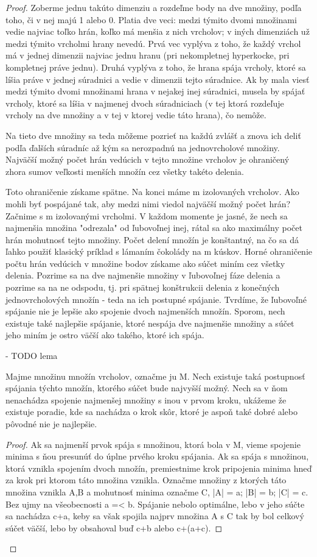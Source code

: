\begin{proof}
Zoberme jednu takúto dimenziu a rozdeľme body na dve množiny, podľa toho,
či v nej majú 1 alebo 0. Platia dve veci: medzi týmito dvomi množinami vedie
najviac toľko hrán, koľko má menšia z nich vrcholov; v iných dimenziách už
medzi týmito vrcholmi hrany nevedú.
Prvá vec vyplýva z toho, že každý vrchol má v jednej dimenzii najviac jednu
hranu (pri nekompletnej hyperkocke, pri kompletnej práve jednu).
Druhá vyplýva z toho, že hrana spája vrcholy, ktoré sa líšia práve v jednej
súradnici a vedie v dimenzii tejto súradnice. Ak by mala viesť medzi týmito
dvomi množinami hrana v nejakej inej súradnici, musela by spájať vrcholy,
ktoré sa líšia v najmenej dvoch súradniciach (v tej ktorá rozdeľuje vrcholy
na dve množiny a v tej v ktorej vedie táto hrana), čo nemôže.

Na tieto dve množiny sa teda môžeme pozrieť na každú zvlášť a znova ich
deliť podľa ďalších súradníc až kým sa nerozpadnú na jednovrcholové množiny.
Najväčší možný počet hrán vedúcich v tejto množine vrcholov je ohraničený
zhora sumov veľkosti menších množín cez všetky takéto delenia.

Toto ohraničenie získame spätne. Na konci máme m izolovaných vrcholov. Ako
mohli byť pospájané tak, aby medzi nimi viedol najväčší možný počet hrán?
Začnime s m izolovanými vrcholmi. V každom momente je jasné, že nech sa
najmenšia množina "odrezala" od ľubovoľnej inej, rátal sa ako maximálny
počet hrán mohutnosť tejto množiny.
Počet delení množín je konštantný, na čo sa dá ľahko použiť klasický príklad
s lámaním čokolády na m kúskov. Horné ohraničenie počtu hrán vedúcich v
množine bodov získame ako súčet miním cez všetky delenia. Pozrime sa na dve
najmenšie množiny v ľubovoľnej fáze delenia a pozrime sa na ne odspodu, tj.
pri spätnej konštrukcii delenia z konečných jednovrcholových množín - teda
na ich postupné spájanie.
Tvrdíme, že ľubovoľné spájanie nie je lepšie ako spojenie dvoch najmenších
množín. Sporom, nech existuje také najlepšie spájanie, ktoré nespája dve najmenšie
množiny a súčet jeho miním je ostro väčší ako takého, ktoré ich spája.

- TODO lema
\begin{lem}
Majme množinu množín vrcholov, označme
ju M. Nech existuje taká postupnosť spájania týchto množín,
ktorého súčet bude najvyšší možný. Nech sa v ňom nenachádza spojenie
najmenšej množiny s inou v prvom kroku, ukážeme že existuje poradie, kde sa
nachádza o krok skôr, ktoré je aspoň také dobré alebo pôvodné nie je
najlepšie.
\end{lem}
\begin{proof}
Ak sa najmenší prvok spája s množinou, ktorá bola v M, vieme spojenie minima
s ňou presunúť do úplne prvého kroku spájania.
Ak sa spája s množinou, ktorá vznikla spojením dvoch množín, premiestnime
krok pripojenia minima hneď za krok pri ktorom táto množina vznikla. Označme
  množiny z ktorých táto množina vznikla A,B a mohutnosť minima 
označme C, |A| = a; |B| = b; |C| = c.
Bez ujmy na všeobecnosti a =< b. Spájanie nebolo optimálne, lebo v jeho súčte sa nachádza
c+a, keby sa však spojila najprv množina A s C tak by bol celkový súčet
väčší, lebo by obsahoval buď c+b alebo c+(a+c).


\end{proof}
\end{proof}
